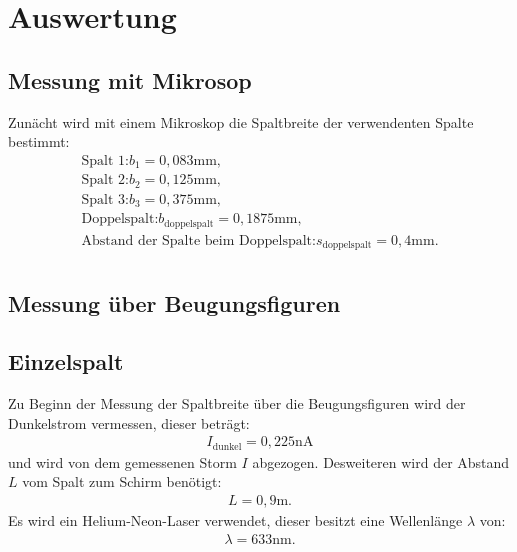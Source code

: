 \section{Auswertung}
\label{sec:Auswertung}
\subsection{Messung mit Mikrosop}
Zunächt wird mit einem Mikroskop die Spaltbreite der verwendenten
Spalte bestimmt:
\begin{align*}
  \text{Spalt 1:}  b_1= 0,083\si{\milli\meter},\\
  \text{Spalt 2:}  b_2= 0,125\si{\milli\meter},\\
  \text{Spalt 3:}  b_3= 0,375\si{\milli\meter},\\
\text{Doppelspalt:} b_\mathrm{doppelspalt}=0,1875\si{\milli\meter},\\
\text{Abstand der Spalte beim Doppelspalt:} s_\mathrm{doppelspalt}=0,4\si{\milli\meter}.\\
\end{align*}
\subsection{Messung über Beugungsfiguren}
\subsection{Einzelspalt}
\label{sec:einzel}

Zu Beginn der Messung der Spaltbreite über die Beugungsfiguren wird der Dunkelstrom vermessen, dieser beträgt:
\begin{align*}
  I_\mathrm{dunkel}= 0,225\si{\nano\ampere}
\end{align*}
und wird von dem gemessenen Storm $I$ abgezogen.
Desweiteren wird der Abstand $L$ vom Spalt zum Schirm benötigt:
\begin{align*}
  L=0,9\si{\meter}.
\end{align*}
Es wird ein Helium-Neon-Laser verwendet, dieser besitzt eine Wellenlänge $\lambda$ von:
\begin{align*}
  \lambda=633\si{\nano\meter}.
\end{align*}


